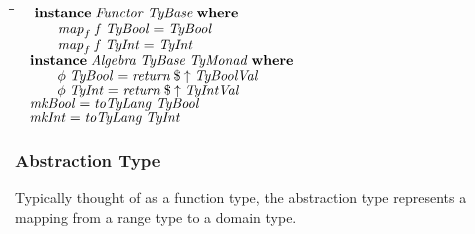 \documentclass[10pt]{article}
\newlength{\lwidth}\setlength{\lwidth}{4.5cm}
\newlength{\cwidth}\setlength{\cwidth}{8mm} %
\newcommand{\Conid}[1]{\mathit{#1}}
\newcommand{\Varid}[1]{\mathit{#1}}
\begin{document}
\begin{tabbing}
\qquad\=\hspace{\lwidth}\=\hspace{\cwidth}\=\+\kill
${\hskip1.00em\relax\mathbf{instance}\;\Conid{Functor}\;\Conid{TyBase}\;\mathbf{where}}$\\
${\hskip1.00em\relax\hskip2.00em\relax\Varid{map}_{f}\;\Varid{f}\;\Conid{TyBool}\mathrel{=}\Conid{TyBool}}$\\
${\hskip1.00em\relax\hskip2.00em\relax\Varid{map}_{f}\;\Varid{f}\;\Conid{TyInt}\mathrel{=}\Conid{TyInt}}$\\
${}$\\
${\hskip1.00em\relax\mathbf{instance}\;\Conid{Algebra}\;\Conid{TyBase}\;\Conid{TyMonad}\;\mathbf{where}}$\\
${\hskip1.00em\relax\hskip2.00em\relax\Varid{\phi}\;\Conid{TyBool}\mathrel{=}\Varid{return}\mathbin{\$}\Varid{\uparrow}\;\Conid{TyBoolVal}}$\\
${\hskip1.00em\relax\hskip2.00em\relax\Varid{\phi}\;\Conid{TyInt}\mathrel{=}\Varid{return}\mathbin{\$}\Varid{\uparrow}\;\Conid{TyIntVal}}$\\
${}$\\
${\hskip1.00em\relax\Varid{mkBool}\mathrel{=}\Varid{toTyLang}\;\Conid{TyBool}}$\\
${\hskip1.00em\relax\Varid{mkInt}\mathrel{=}\Varid{toTyLang}\;\Conid{TyInt}}$
\end{tabbing}
\subsubsection{Abstraction Type}

Typically thought of as a function type, the abstraction type
represents a mapping from a range type to a domain type.
\end{document}
